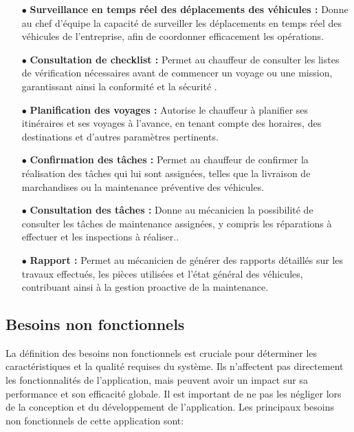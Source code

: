 \begin{itemize}
  \item[$\bullet$] \textbf {Surveillance en temps réel des déplacements des véhicules :} Donne au chef d'équipe la capacité de surveiller les déplacements en temps réel des véhicules de l'entreprise, afin de coordonner efficacement les opérations.\\

  \item[$\bullet$] \textbf {Consultation de checklist :} Permet au chauffeur de consulter les listes de vérification nécessaires avant de commencer un voyage ou une mission, garantissant ainsi la conformité et la sécurité .\\

  \item[$\bullet$] \textbf {Planification des voyages :} Autorise le chauffeur à planifier ses itinéraires et ses voyages à l'avance, en tenant compte des horaires, des destinations et d'autres paramètres pertinents. \\

  \item[$\bullet$] \textbf {Confirmation des tâches :} Permet au chauffeur de confirmer la réalisation des tâches qui lui sont assignées, telles que la livraison de marchandises ou la maintenance préventive des véhicules.\\

  \item[$\bullet$] \textbf {Consultation des tâches :} Donne au mécanicien la possibilité de consulter les tâches de maintenance assignées, y compris les réparations à effectuer et les inspections à réaliser..\\

  \item[$\bullet$] \textbf {Rapport :}  Permet au mécanicien de générer des rapports détaillés sur les travaux effectués, les pièces utilisées et l'état général des véhicules, contribuant ainsi à la gestion proactive de la maintenance.\\


\end{itemize}




\subsection{Besoins non fonctionnels}
La définition des besoins non fonctionnels est cruciale pour déterminer les caractéristiques et la qualité requises du système. Ils n’affectent pas directement les fonctionnalités de l'application, mais peuvent avoir un impact sur sa performance et son efficacité globale. Il est important de ne pas les négliger lors de la conception et du développement de l'application. Les principaux besoins non fonctionnels de cette application sont:


